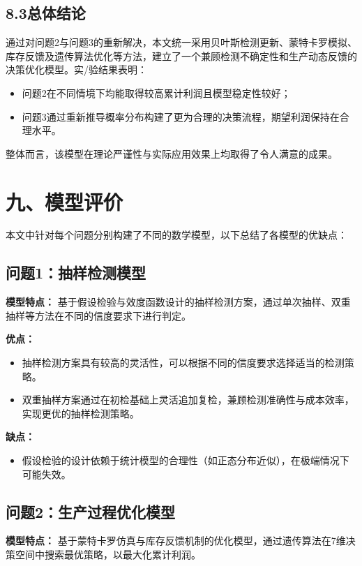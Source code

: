 \documentclass{article}
\begin{document}
	\subsection*{8.3总体结论}
	通过对问题2与问题3的重新解决，本文统一采用贝叶斯检测更新、蒙特卡罗模拟、库存反馈及遗传算法优化等方法，建立了一个兼顾检测不确定性和生产动态反馈的决策优化模型。实/验结果表明：
	\begin{itemize}
		\item 问题2在不同情境下均能取得较高累计利润且模型稳定性较好；
		\item 问题3通过重新推导概率分布构建了更为合理的决策流程，期望利润保持在合理水平。
	\end{itemize}
	整体而言，该模型在理论严谨性与实际应用效果上均取得了令人满意的成果。
	
	\section*{九、模型评价}
	
	本文中针对每个问题分别构建了不同的数学模型，以下总结了各模型的优缺点：
	
	\subsection*{问题1：抽样检测模型}
	
	\textbf{模型特点：}  
	基于假设检验与效度函数设计的抽样检测方案，通过单次抽样、双重抽样等方法在不同的信度要求下进行判定。
	
	\textbf{优点：}  
	\begin{itemize}
		\item 抽样检测方案具有较高的灵活性，可以根据不同的信度要求选择适当的检测策略。
		\item 双重抽样方案通过在初检基础上灵活追加复检，兼顾检测准确性与成本效率，实现更优的抽样检测策略。
	\end{itemize}
	
	\textbf{缺点：}  
	\begin{itemize}
		\item 假设检验的设计依赖于统计模型的合理性（如正态分布近似），在极端情况下可能失效。
	\end{itemize}
	
	\subsection*{问题2：生产过程优化模型}
	
	\textbf{模型特点：}  
	基于蒙特卡罗仿真与库存反馈机制的优化模型，通过遗传算法在7维决策空间中搜索最优策略，以最大化累计利润。
	
\end{document}
